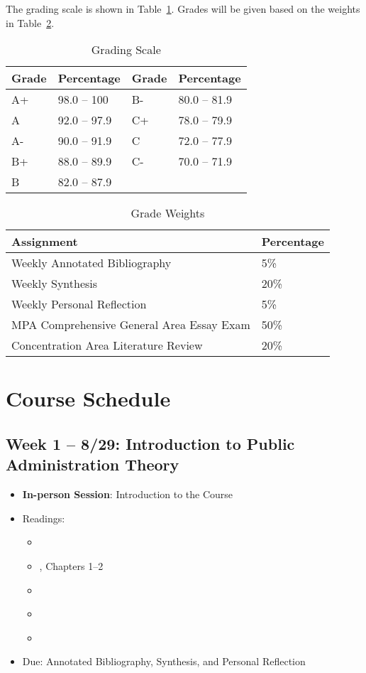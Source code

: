 \documentclass[12pt, letterpaper]{article}
\begin{document}
The grading scale is shown in Table~\ref{tab:grading-scale}. Grades will be given based on the weights in Table~\ref{tab:grade-weights}.

\begin{table}[h]
\centering
\caption{Grading Scale}
\begin{tabular}{llll}
\toprule
\textbf{Grade} & \textbf{Percentage} & \textbf{Grade} & \textbf{Percentage} \\
\midrule
A+ & 98.0 -- 100 & B- & 80.0 -- 81.9\\
A & 92.0 -- 97.9 & C+ & 78.0 -- 79.9\\
A- & 90.0 -- 91.9 & C & 72.0 -- 77.9\\
B+ & 88.0 -- 89.9 & C- & 70.0 -- 71.9\\
B & 82.0 -- 87.9 & & \\

\bottomrule
\end{tabular}
\label{tab:grading-scale}
\end{table}


\begin{table}[h!]
\centering
\caption{Grade Weights}
\begin{tabular}{ll}
    \toprule
\textbf{Assignment} & \textbf{Percentage} \\
\midrule
Weekly Annotated Bibliography & 5\% \\
Weekly Synthesis & 20\% \\
Weekly Personal Reflection & 5\% \\
MPA Comprehensive General Area Essay Exam & 50\% \\
Concentration Area Literature Review & 20\%\\
\bottomrule
\end{tabular}
\label{tab:grade-weights}
\end{table}

\section{Course Schedule}

\subsection*{Week 1 -- 8/29: Introduction to Public Administration Theory}
\begin{itemize}
    \item \textbf{In-person Session}: Introduction to the Course
    \item Readings:
        \begin{itemize}
            \item \cite{Weber1946}
            \item \cite{Denhardt2015}, Chapters 1--2
            \item \cite{Rosenbloom2008}
            \item \cite{Wilson1887}
            \item \cite{Wilson1989}
        \end{itemize}
    \item Due: Annotated Bibliography, Synthesis, and Personal Reflection
\end{itemize}
\end{document}

